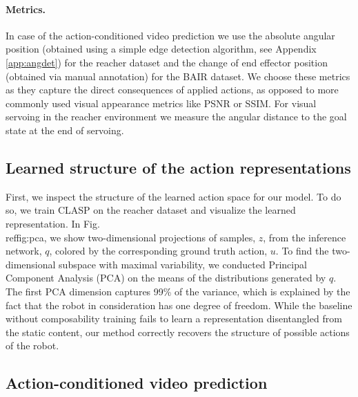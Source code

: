 \documentclass{article} %
\begin{document}
\paragraph{Metrics.} In case of the action-conditioned video prediction we use the absolute angular position (obtained using a simple edge detection algorithm, see Appendix \ref{app:angdet}) for the reacher dataset and the change of end effector position (obtained via manual annotation) for the BAIR dataset. We choose these metrics as they capture the direct consequences of applied actions, as opposed to more commonly used visual appearance metrics like PSNR or SSIM. For visual servoing in the reacher environment we measure the angular distance to the goal state at the end of servoing.




 


\vspace{-3pt}\subsection{Learned structure of the action representations}\vspace{-5pt}
\label{sec:pca}

First, we inspect the structure of the learned action space for our model. To do so, we train CLASP on the reacher dataset and visualize the learned representation. In Fig.\\ref{fig:pca}, we show two-dimensional projections of samples, $z$, from the inference network, $q$, colored by the corresponding ground truth action, $u$. To find the two-dimensional subspace with maximal variability, we conducted Principal Component Analysis (PCA) on the means of the distributions generated by $q$. The first PCA dimension captures 99\% of the variance, which is explained by the fact that the robot in consideration has one degree of freedom. While the baseline without composability training fails to learn a representation disentangled from the static content, our method correctly recovers the structure of possible actions of the robot. 



\subsection{Action-conditioned video prediction}
\label{sec:action_cond}
\end{document}
